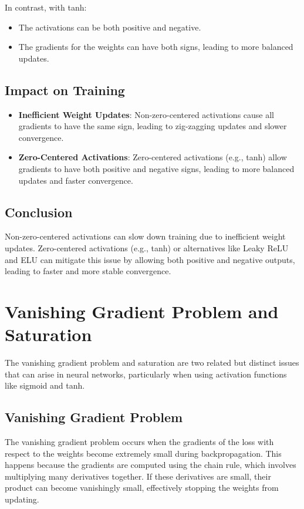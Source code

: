 \begin{notechapter}
In contrast, with tanh:
\begin{itemize}[leftmargin=*]
    \item The activations can be both positive and negative.
    \item The gradients for the weights can have both signs, leading to more
    balanced updates.
\end{itemize}

\subsection{Impact on Training}
\begin{itemize}[leftmargin=*]
    \item \textbf{Inefficient Weight Updates}: Non-zero-centered activations
    cause all gradients to have the same sign, leading to zig-zagging updates
    and slower convergence.
    \item \textbf{Zero-Centered Activations}: Zero-centered activations (e.g.,
    tanh) allow gradients to have both positive and negative signs, leading to
    more balanced updates and faster convergence.
\end{itemize}

\subsection{Conclusion}
Non-zero-centered activations can slow down training due to inefficient weight
updates. Zero-centered activations (e.g., tanh) or alternatives like Leaky ReLU
and ELU can mitigate this issue by allowing both positive and negative outputs,
leading to faster and more stable convergence.

\section{Vanishing Gradient Problem and Saturation}
The vanishing gradient problem and saturation are two related but distinct issues
that can arise in neural networks, particularly when using activation functions
like sigmoid and tanh.

\subsection{Vanishing Gradient Problem}
The vanishing gradient problem occurs when the gradients of the loss with respect
to the weights become extremely small during backpropagation. This happens because
the gradients are computed using the chain rule, which involves multiplying many
derivatives together. If these derivatives are small, their product can become
vanishingly small, effectively stopping the weights from updating.


\end{notechapter}

